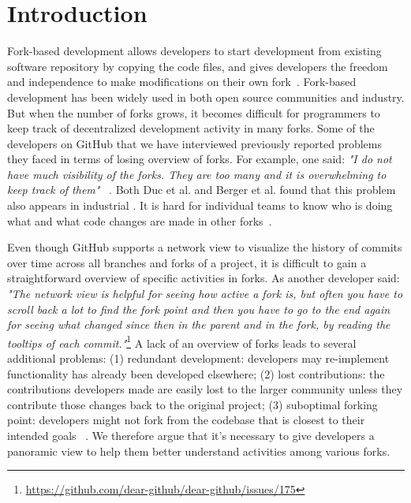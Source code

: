 \section{Introduction}
Fork-based development allows developers to start development from existing software repository by copying the code files, and gives developers the freedom and independence to make modifications on their own fork~\cite{dubinsky2013exploratory, bitzer2006impact, ernst2010code,vetter2007open}. Fork-based development has been widely used in both open source communities and industry. But when the number of forks grows, it becomes difficult for programmers to keep track of decentralized development activity in many forks. Some of the developers on GitHub that we have interviewed previously reported problems they faced in terms of losing overview of forks. For example, one said: \emph{"I do not have much visibility of the forks. They are too many and it is overwhelming to keep track of them"} ~\cite{ZSLXWK:ICSE18}. Both Duc et al. and Berger et al. found that this problem also appears in industrial . It is hard for individual teams to know who is doing what and what code changes are made in other forks~\cite{berger2014three,Duc:2014:FCM:2652524.2652546}.

Even though GitHub supports a network view to visualize the history of commits over time across all branches and forks of a project, it is difficult to gain a straightforward overview of specific activities in forks. As another developer said: \emph{"The network view is helpful for seeing how active a fork is, but often you have to scroll back a lot to find the fork point and then you have to go to the end again for seeing what changed since then in the parent and in the fork, by reading the tooltips of each commit."}\footnote{\url{https://github.com/dear-github/dear-github/issues/175}}
 A lack of an overview of forks leads to several additional problems: (1) redundant development: developers may re-implement functionality has already been developed elsewhere; (2) lost contributions: the contributions developers made are easily lost to the larger community unless they contribute those changes back to the original project; (3) suboptimal forking point: developers might not fork from the codebase that is closest to their intended goals ~\cite{ZSLXWK:ICSE18, dubinsky2013exploratory,stanciulescu2015forked}. We therefore argue that it's necessary to give developers a panoramic view to help them better understand activities among various forks.

